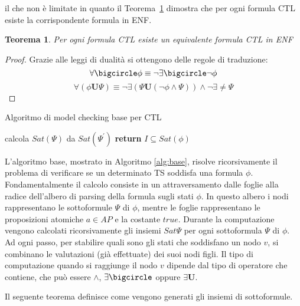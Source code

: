\documentclass[a4paper, 10pt]{article}
\newtheorem{theor}{Teorema}[section]
\numberwithin{equation}{theor}
\begin{document}
il che non è limitate in quanto il Teorema~\ref{theorem:enf} dimostra che per ogni formula \ac{CTL} esiste la corrispondente formula in \ac{ENF}.
\begin{theor}
\label{theorem:enf}
Per ogni formula \ac{CTL} esiste un equivalente formula \ac{CTL} in \ac{ENF}
\end{theor}
\begin{proof}
Grazie alle leggi di dualità si ottengono delle regole di traduzione:
$$\forall\bigcircle \phi \equiv \neg \exists \bigcircle \neg \phi$$
$$\forall(\phi \boldsymbol{U} \Psi) \equiv \neg \exists( \Psi \boldsymbol{U} (\neg \phi \wedge \Psi)  )\wedge \neg\exists\neq\Psi$$
\end{proof}
\begin{algorithm}
\label{alg:base}
\caption{Algoritmo di model checking base per \ac{CTL}}
\begin{algorithmic}[1]
\State calcola $Sat(\Psi)$ da $Sat(\Psi^{'})$
\EndFor
\EndFor
\State \textbf{return} $I  \subseteq Sat(\phi)$
\EndProcedure
\end{algorithmic}
\end{algorithm}
L'algoritmo base, mostrato in Algoritmo \ref{alg:base}, risolve ricorsivamente il problema di verificare se un determinato \ac{TS} soddisfa una formula $\phi$.
Fondamentalmente il calcolo consiste in un attraversamento dalle foglie alla radice dell'albero di parsing della formula sugli stati $\phi$. In questo albero i nodi rappresentano le sottoformule $\Psi$ di $\phi$, mentre le foglie rappresentano le proposizioni atomiche $a \in AP$ e la costante $true$.
Durante la computazione vengono calcolati ricorsivamente gli insiemi $Sat{\Psi}$ per ogni sottoformula $\Psi$ di $\phi$. Ad ogni passo, per stabilire quali sono gli stati che soddisfano un nodo $v$, si combinano le valutazioni (già effettuate) dei suoi nodi figli. Il tipo di computazione quando si raggiunge il nodo $v$ dipende dal tipo di operatore che contiene, che può essere $\wedge$, $\exists\bigcircle$ oppure $\exists\boldsymbol{U}$.\par
Il seguente teorema definisce come vengono generati gli insiemi di sottoformule.
\end{document}
